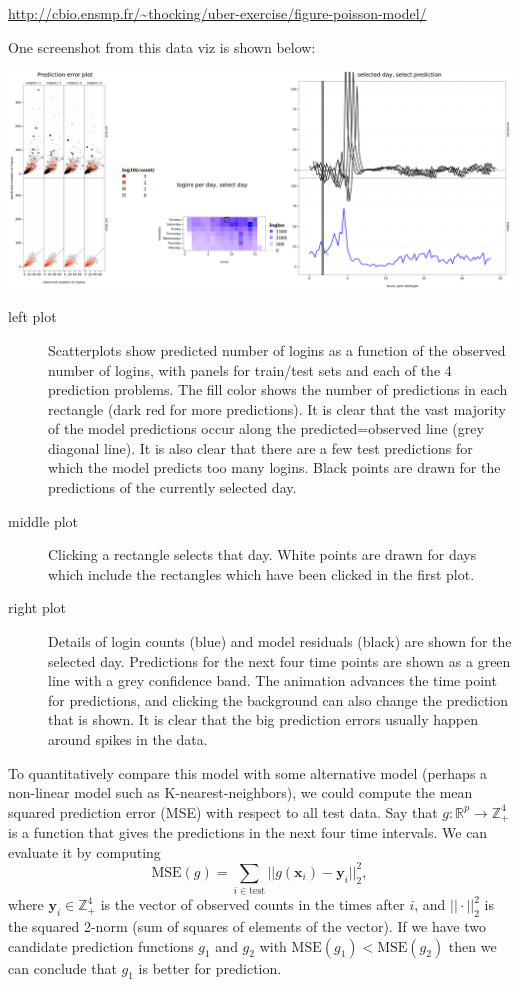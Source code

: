 \documentclass{article}
\begin{document}
\url{http://cbio.ensmp.fr/~thocking/uber-exercise/figure-poisson-model/}

One screenshot from this data viz is shown below:

\begin{center}
  \includegraphics[width=\textwidth]{screenshot-predictions.png}
\end{center}

\begin{description}
\item[left plot] Scatterplots show predicted number of logins as a
  function of the observed number of logins, with panels for
  train/test sets and each of the 4 prediction problems. The fill
  color shows the number of predictions in each rectangle (dark red
  for more predictions). It is clear that the vast majority of the
  model predictions occur along the predicted=observed line (grey
  diagonal line). It is also clear that there are a few test
  predictions for which the model predicts too many logins. Black
  points are drawn for the predictions of the currently selected day.
\item[middle plot] Clicking a rectangle selects that day. White points
  are drawn for days which include the rectangles which have been
  clicked in the first plot.
\item[right plot] Details of login counts (blue) and model residuals
  (black) are shown for the selected day. Predictions for the next
  four time points are shown as a green line with a grey confidence
  band. The animation advances the time point for predictions, and
  clicking the background can also change the prediction that is
  shown. It is clear that the big prediction errors usually happen
  around spikes in the data.
\end{description}

To quantitatively compare this model with some alternative model
(perhaps a non-linear model such as K-nearest-neighbors), we could
compute the mean squared prediction error (MSE) with respect to all test
data. Say that $g:\mathbb R^p\rightarrow \mathbb Z_+^4$ is a function
that gives the predictions in the next four time intervals. We can
evaluate it by computing
\begin{equation}
  \text{MSE}(g) = \sum_{i\in\text{test}} ||g(\mathbf x_i)-\mathbf y_{i}||^2_2,
\end{equation}
where $\mathbf y_i\in\mathbb Z_+^4$ is the vector of observed counts
in the times after $i$, and $||\cdot||_2^2$ is the squared 2-norm (sum
of squares of elements of the vector). If we have two candidate
prediction functions $g_1$ and $g_2$ with
$\text{MSE}(g_1)<\text{MSE}(g_2)$ then we can conclude that $g_1$ is
better for prediction.
\end{document}
